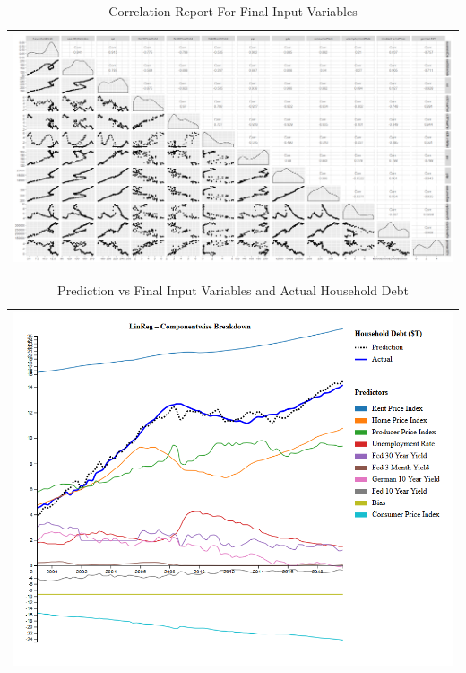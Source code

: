 \documentclass[sigconf,nonacm,11pt]{acmart}
\begin{document}
\begin{appendix}
\begin{table}[ht]
\caption{Correlation Report For Final Input Variables}
\centering
\begin{tabular}{p{1.0\linewidth}}
\hline
\includegraphics[scale = 0.27]{Correlation_Plot_Final.png}\\
\hline
\end{tabular}
\end{table}

\begin{table}[ht]
\caption{Prediction vs Final Input Variables and Actual Household Debt}
\centering
\begin{tabular}{p{1.0\linewidth}}
\hline
\includegraphics[scale = 0.27]{linreg.png}\\
\hline
\end{tabular}
\end{table}



\end{appendix}
\end{document}
